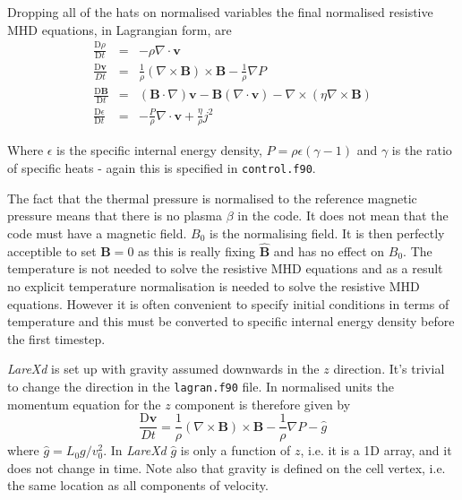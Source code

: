 \documentclass[11pt]{article}
\begin{document}
Dropping all of the hats on normalised variables the final normalised resistive MHD equations, in Lagrangian form, are
\begin{eqnarray}
\frac{\mathrm{D}\rho}{\mathrm{D}t}&=&-\rho \nabla\cdot \mathbf{v}\\
\frac{\mathrm{D}\mathbf{v}}{Dt}&=&\frac{1}{\rho}(\nabla\times\mathbf{B})\times\mathbf{B}
-\frac{1}{\rho}\nabla P \label{velocity_eqn}\\
\frac{\mathrm{D}\mathbf{B}}{\mathrm{D}t}&=&(\mathbf{B}\cdot\nabla)\mathbf{v}-\mathbf{B}
(\nabla\cdot\mathbf{v})-\nabla\times(\eta\nabla\times\mathbf{B})\\
\frac{\mathrm{D}\epsilon}{\mathrm{D}t}&=&-\frac{P}{\rho}\nabla\cdot\mathbf{v}+\frac
{\eta}{\rho}j^{2} \label{energy_eqn}
\end{eqnarray}

Where $\epsilon$ is the specific internal energy density, $P = \rho \epsilon(\gamma - 1)$ and $\gamma$ is the ratio of specific heats - again this is specified in \texttt{control.f90}.

The fact that the thermal pressure is normalised to the reference magnetic pressure means that there is no plasma $\beta$ in the code. It does not mean that the code must have a magnetic field. $B_0$ is the normalising field. It is then perfectly acceptible to set $\mathbf{B}=0$ as this is really fixing $\hat{\mathbf{B}}$ and has no effect on  $B_0$. The temperature is not needed to solve the resistive MHD equations and as a result no explicit temperature normalisation is needed to solve the resistive MHD equations. However it is often convenient to specify initial conditions in terms of temperature and this must be converted to specific internal energy density before the first timestep. 

{\it LareXd} is set up with gravity assumed downwards in the $z$ direction. It's trivial to change the direction in the \texttt{lagran.f90} file. In normalised units the momentum equation for the $z$ component is therefore given by
\begin{displaymath}
 \frac{\mathrm{D}\mathbf{v}}{Dt}=\frac{1}{\rho}(\nabla\times\mathbf{B})\times\mathbf{B}
-\frac{1}{\rho}\nabla P-\hat{g}
\end{displaymath} 
where $\hat{g}=L_0 g / v_0^2$. In {\it LareXd} $\hat{g}$ is only a function of $z$, i.e. it is a 1D array, and it does not change in time. Note also that gravity is defined on the cell vertex, i.e. the same location as all components of velocity.
\end{document}
